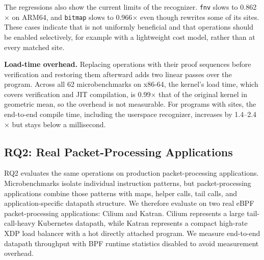 The regressions also show the current limits of the recognizer.
\texttt{fnv} slows to 0.862$\times$ on ARM64, and \texttt{bitmap} slows to 0.966$\times$ even though \lang rewrites some of its sites.
These cases indicate that \lang is not uniformly beneficial and that \lang operations should be enabled selectively, for example with a lightweight cost model, rather than at every matched site.

\noindent\textbf{Load-time overhead.}
Replacing \lang operations with their proof sequences before verification and restoring them afterward adds two linear passes over the program.
Across all 62 microbenchmarks on x86-64, the kernel's load time, which covers verification and JIT compilation, is 0.99$\times$ that of the original kernel in geometric mean, so the overhead is not measurable.
For programs with \lang sites, the end-to-end compile time, including the userspace recognizer, increases by 1.4--2.4$\times$ but stays below a millisecond.



\subsection{RQ2: Real Packet-Processing Applications}
\label{subsec:corpus_application}

RQ2 evaluates the same \lang operations on production packet-processing applications.
Microbenchmarks isolate individual instruction patterns, but packet-processing applications combine those patterns with maps, helper calls, tail calls, and application-specific datapath structure.
We therefore evaluate \lang on two real eBPF packet-processing applications: Cilium and Katran.
Cilium represents a large tail-call-heavy Kubernetes datapath, while Katran represents a compact high-rate XDP load balancer with a hot directly attached program.
We measure end-to-end datapath throughput with BPF runtime statistics disabled to avoid measurement overhead.

